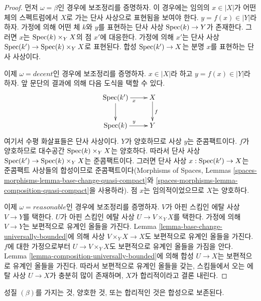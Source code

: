 \begin{proof}
먼저 $\omega = \beta$인 경우에 보조정리를 증명하자. 이 경우에는
임의의 $x \in |X|$가 어떤 체의 스펙트럼에서 $X$로 가는 단사 사상으로
표현됨을 보여야 한다. $y = f(x) \in |Y|$라 하자. 가정에 의해 어떤 체
$k$와 $y$를 표현하는 단사 사상 $\mathop{\mathrm{Spec}}(k) \to Y$가 존재한다.
그러면 $x$는 $\mathop{\mathrm{Spec}}(k) \times_Y X$의 점 $x'$에 대응한다.
가정에 의해 $x'$는 단사 사상
$\mathop{\mathrm{Spec}}(k') \to \mathop{\mathrm{Spec}}(k) \times_Y X$로 표현된다. 합성
$\mathop{\mathrm{Spec}}(k') \to X$는 분명 $x$를 표현하는 단사 사상이다.

\medskip\noindent
이제 $\omega = decent$인 경우에 보조정리를 증명하자.
$x \in |X|$라 하고 $y = f(x) \in |Y|$라 하자. 앞 문단의 결과에 의해
다음 도식을 택할 수 있다.
$$
\xymatrix{
\Spec(k') \ar[r]_x \ar[d] & X \ar[d]^f \\
\Spec(k) \ar[r]^y & Y
}
$$
여기서 수평 화살표들은 단사 사상이다. $Y$가 양호하므로 사상 $y$는
준콤팩트이다. $f$가 양호하므로 대수공간 $\mathop{\mathrm{Spec}}(k) \times_Y X$는
양호하다. 따라서 단사 사상
$\mathop{\mathrm{Spec}}(k') \to \mathop{\mathrm{Spec}}(k) \times_Y X$는 준콤팩트이다.
그러면 단사 사상 $x : \mathop{\mathrm{Spec}}(k') \to X$는 준콤팩트 사상들의 합성이므로
준콤팩트이다(Morphisms of Spaces, Lemmas
\ref{spaces-morphisms-lemma-base-change-quasi-compact}와
\ref{spaces-morphisms-lemma-composition-quasi-compact}을 사용하라).
점 $x$는 임의적이었으므로 $X$는 양호하다.

\medskip\noindent
이제 $\omega = reasonable$인 경우에 보조정리를 증명하자.
$V$가 아핀 스킴인 에탈 사상 $V \to Y$를 택한다.
$U$가 아핀 스킴인 에탈 사상 $U \to V \times_Y X$를 택한다.
가정에 의해 $V \to Y$는 보편적으로 유계인 올들을 가진다. Lemma
\ref{lemma-base-change-universally-bounded}에 의해 사상
$V \times_Y X \to X$도 보편적으로 유계인 올들을 가진다.
$f$에 대한 가정으로부터 $U \to V \times_Y X$도 보편적으로 유계인
올들을 가짐을 안다. Lemma \ref{lemma-composition-universally-bounded}에
의해 합성 $U \to X$는 보편적으로 유계인 올들을 가진다.
따라서 보편적으로 유계인 올들을 갖는, 스킴들에서 오는 에탈 사상
$U \to X$가 충분히 많이 존재하며, $X$가 합리적이라고 결론 내린다.
\end{proof}

\begin{lemma}
\label{lemma-composition-relative-conditions}
성질 $(\beta)$를 가지는 것, 양호한 것, 또는 합리적인 것은 합성으로
보존된다.
\end{lemma}

